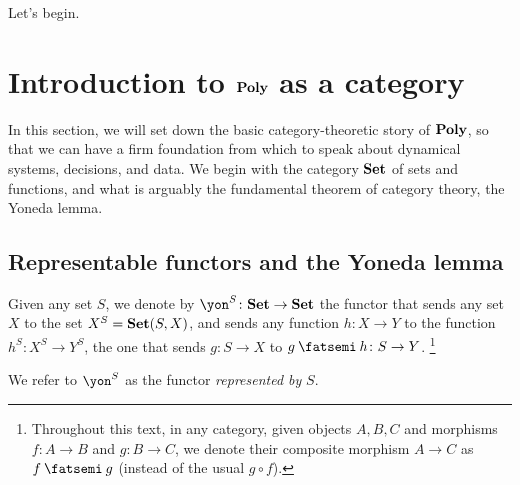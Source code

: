 \documentclass[Book-Poly]{subfiles}
\begin{document}
Let's begin.


\section{Introduction to $\textbf{Poly}$ as a category}\label{sec.poly}


In this section, we will set down the basic category-theoretic story of $\textbf{Poly}$, so that we can have a firm foundation from which to speak about dynamical systems, decisions, and data. We begin with the category $\textbf{Set}$ of sets and functions, and what is arguably the fundamental theorem of category theory, the Yoneda lemma.

\subsection{Representable functors and the Yoneda lemma}

\begin{definition} \label{def.representable}
Given any set $S$, we denote by $\yon^S\colon\smset\to\smset$ the functor that sends any set $X$ to the set $X^S=\textbf{Set}(S,X)$, and sends any function $h\colon X\to Y$ to the function $h^S\colon X^S\to Y^S$, the one that sends $g\colon S\to X$ to $g\then h\colon S\to Y$. \footnote{Throughout this text, in any category, given objects $A, B, C$ and morphisms $f \colon A \to B$ and $g \colon B \to C$, we denote their composite morphism $A \to C$ as $f \then g$ (instead of the usual $g \circ f$).}

We refer to $\yon^S$ as the functor \emph{represented by} $S$.
\end{definition}
\end{document}

